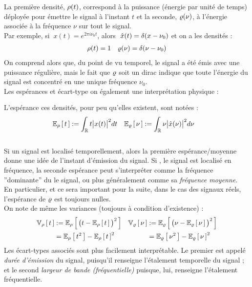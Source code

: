 La première densité, $\densit(t)$, correspond à la puissance (énergie par unité de temps) déployée pour émettre le signal à l'instant $t$ et la seconde, $\densis(\nu)$, à l'énergie associée à la fréquence $\nu$ sur tout le signal. 
\\
Par exemple, si $\ x(t)=e^{2\pi i\nu_0 t}$, alors $\ \fou{x}(t) = \delta(x-\nu_0)$ et on a les densités :
\begin{align*}
	\densit(t) &= 1  &  \densis(\nu) = \delta(\nu-\nu_0)
\end{align*}
On comprend alors que, du point de vu temporel, le signal a été émis avec une puissance régulière, mais le fait que $\densis$ soit un dirac indique que toute l'énergie du signal est concentré en une unique fréquence $\nu_0$.
\\

Les espérances et écart-type on également une interprétation physique :

\begin{definition}\label{def:band-width}
	L'espérance ces densités, pour peu qu'elles existent, sont notées :
	\begin{align*}
		\esp[\densit]{t} &\defeq \int_\R t \big|x(t)\big|^2 dt   &  \esp[\densis]{\nu} &\defeq \int_\R \nu \big|\fou{x}(\nu)\big|^2 d\nu
	\end{align*}
	\\
	Si un signal est localisé temporellement, alors la première espérance/moyenne donne une idée de l'instant d'émission du signal. Si \acontrario, le signal est localisé en fréquence, la seconde espérance peut s'interpréter comme la fréquence ''dominante'' du le signal, ou plus généralement comme sa \emph{fréquence moyenne}. \\
	En particulier, et ce sera important pour la suite, dans le cas des signaux réels, l'espérance de $\densis$ est toujours nulles.
	\\
	On note de même les variances (toujours à condition d'existence) :
	\begin{align*}
		\var[\densit]{t} &\defeq \esp[\densit]{\big(t-\esp[\densit]{t}\big)^2}  &  \var[\densis]{\nu} &\defeq \esp[\densis]{\big(\nu - \esp[\densis]{\nu}\big)^2}\\
		& = \esp[\densit]{t^2} - \esp[\densit]{t}^2  &  &= \esp[\densis]{\nu^2} - \esp[\densis]{\nu}^2
	\end{align*}
	Les écart-types associés sont plus facilement interprétable. Le premier est appelé \emph{durée d'émission} du signal, puisqu'il renseigne l'étalement temporelle du signal ; et le second \emph{largeur de bande (fréquentielle)} puisque, lui, renseigne l'étalement fréquentielle. 
\end{definition}

